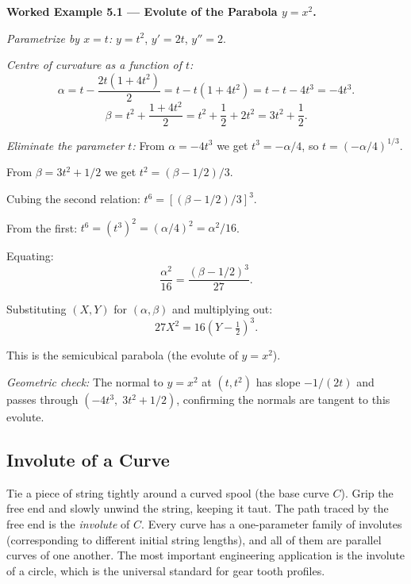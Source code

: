 \documentclass[12pt,a4paper]{article}
\begin{document}
\textbf{Worked Example 5.1 --- Evolute of the Parabola $y = x^2$.}

\textit{Parametrize by $x = t$:} $y = t^{2}$, $y' = 2t$, $y'' = 2$.

\textit{Centre of curvature as a function of $t$:}
\[
  \alpha = t - \frac{2t(1+4t^{2})}{2} = t - t(1+4t^{2}) = t - t - 4t^{3} = -4t^{3}.
\]
\[
  \beta = t^{2} + \frac{1+4t^{2}}{2} = t^{2} + \frac{1}{2} + 2t^{2} = 3t^{2} + \frac{1}{2}.
\]

\textit{Eliminate the parameter $t$:} From $\alpha = -4t^{3}$ we get $t^{3} = -\alpha/4$, so $t = (-\alpha/4)^{1/3}$.

From $\beta = 3t^{2} + 1/2$ we get $t^{2} = (\beta - 1/2)/3$.

Cubing the second relation: $t^{6} = [(\beta-1/2)/3]^{3}$.

From the first: $t^{6} = (t^{3})^{2} = (\alpha/4)^{2} = \alpha^{2}/16$.

Equating:
\[
  \frac{\alpha^{2}}{16} = \frac{(\beta - 1/2)^{3}}{27}.
\]

Substituting $(X, Y)$ for $(\alpha, \beta)$ and multiplying out:
\[
  27 X^{2} = 16\!\left(Y - \tfrac{1}{2}\right)^{3}.
\]

This is the semicubical parabola (the evolute of $y = x^{2}$).

\textit{Geometric check:} The normal to $y = x^{2}$ at $(t, t^{2})$ has slope $-1/(2t)$ and passes through $(-4t^{3},\; 3t^{2}+1/2)$, confirming the normals are tangent to this evolute. \checkmark

\subsection{Involute of a Curve}

Tie a piece of string tightly around a curved spool (the base curve $C$). Grip the free end and slowly unwind the string, keeping it taut. The path traced by the free end is the \emph{involute} of $C$. Every curve has a one-parameter family of involutes (corresponding to different initial string lengths), and all of them are parallel curves of one another. The most important engineering application is the involute of a circle, which is the universal standard for gear tooth profiles.
\end{document}
